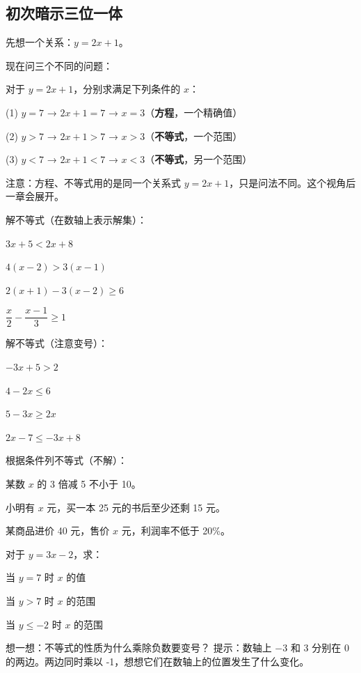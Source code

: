 \subsection*{初次暗示三位一体}

先想一个关系：$y = 2x + 1$。

现在问三个不同的问题：

\begin{example}
对于 $y=2x+1$，分别求满足下列条件的 $x$：
\end{example}
\begin{solution}
(1) $y=7$ → $2x+1=7$ → $x=3$（\textbf{方程}，一个精确值）

(2) $y>7$ → $2x+1>7$ → $x>3$（\textbf{不等式}，一个范围）

(3) $y<7$ → $2x+1<7$ → $x<3$（\textbf{不等式}，另一个范围）
\end{solution}

注意：方程、不等式用的是同一个关系式 $y=2x+1$，只是问法不同。这个视角后一章会展开。

\begin{exercise}
\item 解不等式（在数轴上表示解集）：
  \begin{subexercise}
    \item $3x+5<2x+8$
    \item $4(x-2)>3(x-1)$
    \item $2(x+1)-3(x-2)\ge 6$
    \item $\dfrac{x}{2}-\dfrac{x-1}{3} \ge 1$
  \end{subexercise}

\item 解不等式（注意变号）：
  \begin{subexercise}
    \item $-3x+5 > 2$
    \item $4-2x \le 6$
    \item $5-3x \ge 2x$
    \item $2x-7 \le -3x+8$
  \end{subexercise}

\item 根据条件列不等式（不解）：
  \begin{subexercise}
    \item 某数 $x$ 的 3 倍减 5 不小于 10。
    \item 小明有 $x$ 元，买一本 25 元的书后至少还剩 15 元。
    \item 某商品进价 40 元，售价 $x$ 元，利润率不低于 20\%。
  \end{subexercise}

\item 对于 $y = 3x - 2$，求：
  \begin{subexercise}
    \item 当 $y=7$ 时 $x$ 的值
    \item 当 $y>7$ 时 $x$ 的范围
    \item 当 $y\le-2$ 时 $x$ 的范围
  \end{subexercise}

\item 想一想：不等式的性质为什么乘除负数要变号？
  提示：数轴上 $-3$ 和 $3$ 分别在 0 的两边。两边同时乘以 -1，想想它们在数轴上的位置发生了什么变化。
\end{exercise}

